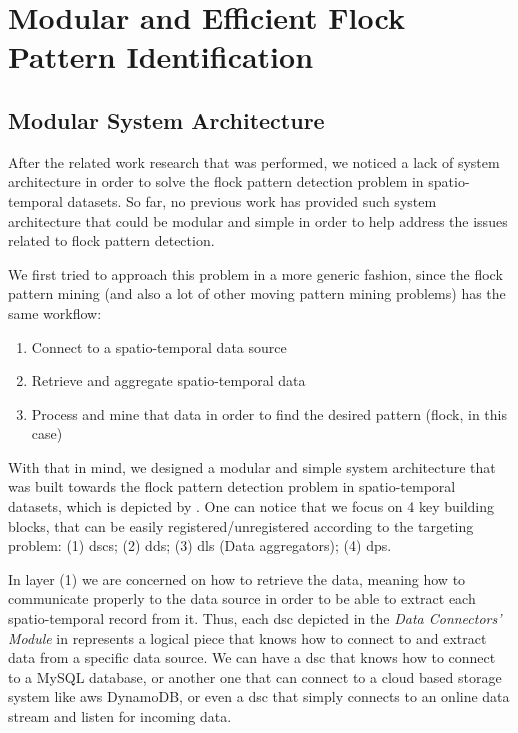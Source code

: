 \chapter{Modular and Efficient Flock Pattern Identification}
\label{chp:solution}
\section{Modular System Architecture}
\label{sec:architecture}
After the related work research that was performed, we noticed a lack of system architecture in order to solve the flock
pattern detection problem in spatio-temporal datasets. So far, no previous work has provided such system architecture
that could be modular and simple in order to help address the issues related to flock pattern detection.

We first tried to approach this problem in a more generic fashion, since the flock pattern mining (and also a lot of
other moving pattern mining problems) has the same workflow:

\begin{enumerate}
    \item Connect to a spatio-temporal data source
    \item Retrieve and aggregate spatio-temporal data
    \item Process and mine that data in order to find the desired pattern (flock, in this case)
\end{enumerate}

With that in mind, we designed a modular and simple system architecture that was built towards the flock pattern
detection problem in spatio-temporal datasets, which is depicted by . One can notice that we
focus on 4 key building blocks, that can be easily registered/unregistered according to the targeting problem: (1)
\acp{dsc}; (2) \acp{dd}; (3) \acp{dl} (Data aggregators); (4) \acp{dp}.

In layer (1) we are concerned on how to retrieve the data, meaning how to communicate properly to the data source in
order to be able to extract each spatio-temporal record from it. Thus, each \ac{dsc} depicted in the \textit{Data
Connectors' Module} in  represents a logical piece that knows how to connect to and extract
data from a specific data source. We can have a \ac{dsc} that knows how to connect to a MySQL database, or another one
that can connect to a cloud based storage system like \ac{aws} DynamoDB, or even a \ac{dsc} that simply connects to an
online data stream and listen for incoming data.

